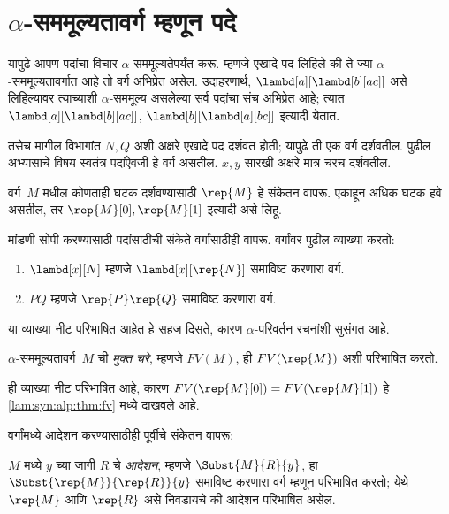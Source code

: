 \section{$\alpha$-सममूल्यतावर्ग म्हणून पदे}\label{lam:syn:tr:sec}

यापुढे आपण पदांचा विचार $\alpha$-सममूल्यतेपर्यंत करू.
म्हणजे एखादे पद लिहिले की ते ज्या $\alpha$-सममूल्यतावर्गात
आहे तो वर्ग अभिप्रेत असेल. उदाहरणार्थ,
$\lambd[a][\lambd[b][a c]]$ असे लिहिल्यावर त्याच्याशी
$\alpha$-सममूल्य असलेल्या सर्व पदांचा संच अभिप्रेत आहे;
त्यात $\lambd[a][\lambd[b][a
    c]]$, $\lambd[b][\lambd[a][b c]]$ इत्यादी येतात.

तसेच मागील विभागांत $N, Q$ अशी अक्षरे एखादे पद
दर्शवत होती; यापुढे ती एक वर्ग दर्शवतील. पुढील अभ्यासाचे
विषय स्वतंत्र पदांऐवजी हे वर्ग असतील. $x, y$ सारखी
अक्षरे मात्र चरच दर्शवतील.

वर्ग~$M$ मधील कोणताही घटक दर्शवण्यासाठी
$\rep{M}$ हे संकेतन वापरू. एकाहून अधिक घटक हवे
असतील, तर $\rep{M}[0], \rep{M}[1]$ इत्यादी असे लिहू.

मांडणी सोपी करण्यासाठी पदांसाठीची संकेते वर्गांसाठीही
वापरू. वर्गांवर पुढील व्याख्या करतो:
\begin{defn}
  \begin{enumerate}
  \item $\lambd[x][N]$ म्हणजे $\lambd[x][\rep{N}]$
    समाविष्ट करणारा वर्ग.
  \item $PQ$ म्हणजे $\rep{P}\rep{Q}$ समाविष्ट करणारा वर्ग.
  \end{enumerate}
\end{defn}

या व्याख्या नीट परिभाषित आहेत हे सहज दिसते,
कारण $\alpha$-परिवर्तन रचनांशी सुसंगत आहे.

\begin{defn} \label{lam:syn:tr:def:fv}
  $\alpha$-सममूल्यतावर्ग~$M$ ची \emph{मुक्त चरे},
  म्हणजे $FV(M)$, ही $FV(\rep{M})$ अशी परिभाषित करतो.
\end{defn}

ही व्याख्या नीट परिभाषित आहे, कारण
$FV(\rep{M}[0]) =
FV(\rep{M}[1])$ हे \ref{lam:syn:alp:thm:fv} मध्ये दाखवले आहे.

वर्गांमध्ये आदेशन करण्यासाठीही पूर्वीचे संकेतन वापरू:
\begin{defn} \label{lam:syn:tr:def:sub}
  $M$ मध्ये $y$ च्या जागी $R$ चे \emph{आदेशन}, म्हणजे
  $\Subst{M}{R}{y}$, हा $\Subst{\rep{M}}{\rep{R}}{y}$
  समाविष्ट करणारा वर्ग म्हणून परिभाषित करतो; येथे
  $\rep{M}$ आणि $\rep{R}$ असे निवडायचे की आदेशन
  परिभाषित असेल.
\end{defn}

